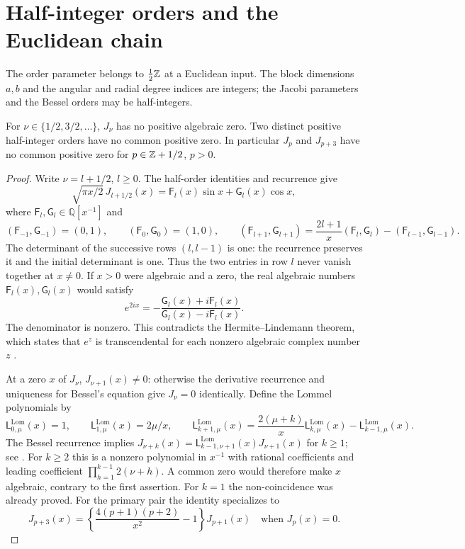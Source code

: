 \section{Half-integer orders and the Euclidean chain}\label{inf:sec-parity}

The order parameter belongs to $\tfrac12\mathbb{Z}$ at a Euclidean input.
The block dimensions $a,b$ and the angular and radial degree indices
are integers; the Jacobi parameters and the Bessel orders may be
half-integers.

\begin{lemma}\label{inf:half-integer-noncoincidence}
For $\nu\in\{1/2,3/2,\ldots\}$, $J_\nu$ has no positive algebraic
zero. Two distinct positive half-integer orders have no common positive
zero. In particular $J_p$ and $J_{p+3}$ have no common positive zero
for $p\in\mathbb{Z}+1/2$, $p>0$.
\end{lemma}
\begin{proof}
Write $\nu=l+1/2$, $l\ge0$. The half-order identities and recurrence
\cite[\S\S10.6, 10.16]{inf:dlmf} give
\[
 \sqrt{\pi x/2}\,J_{l+1/2}(x)
 =\mathsf F_l(x)\sin x+\mathsf G_l(x)\cos x,
\]
where $\mathsf F_l,\mathsf G_l\in\mathbb Q[x^{-1}]$ and
\[
 (\mathsf F_{-1},\mathsf G_{-1})=(0,1),\qquad
 (\mathsf F_0,\mathsf G_0)=(1,0),\qquad
 (\mathsf F_{l+1},\mathsf G_{l+1})
 =\frac{2l+1}{x}(\mathsf F_l,\mathsf G_l)
       -(\mathsf F_{l-1},\mathsf G_{l-1}).
\]
The determinant of the successive rows $(l,l-1)$ is one: the
recurrence preserves it and the initial determinant is one.
Thus the two entries in row $l$ never vanish together at $x\ne0$.
If $x>0$ were algebraic and a zero, the real algebraic numbers
$\mathsf F_l(x),\mathsf G_l(x)$ would satisfy
\[
 e^{2ix}=-\frac{\mathsf G_l(x)+i\mathsf F_l(x)}
                  {\mathsf G_l(x)-i\mathsf F_l(x)}.
\]
The denominator is nonzero. This contradicts the Hermite--Lindemann
theorem, which states that $e^z$ is transcendental for each nonzero
algebraic complex number $z$ \cite[\S1.2]{inf:BakerWustholz}.

At a zero $x$ of $J_\nu$, $J_{\nu+1}(x)\ne0$: otherwise the derivative
recurrence and uniqueness for Bessel's equation give $J_\nu=0$
identically. Define the Lommel polynomials by
\[
 \mathsf L^{\mathrm{Lom}}_{0,\mu}(x)=1,\qquad
 \mathsf L^{\mathrm{Lom}}_{1,\mu}(x)=2\mu/x,\qquad
 \mathsf L^{\mathrm{Lom}}_{k+1,\mu}(x)
 =\frac{2(\mu+k)}x\mathsf L^{\mathrm{Lom}}_{k,\mu}(x)
     -\mathsf L^{\mathrm{Lom}}_{k-1,\mu}(x).
\]
The Bessel recurrence implies
$J_{\nu+k}(x)=\mathsf L^{\mathrm{Lom}}_{k-1,\nu+1}(x)J_{\nu+1}(x)$
for $k\ge1$; see \cite{inf:watson}.
For $k\ge2$ this is a nonzero polynomial in $x^{-1}$ with rational
coefficients and leading coefficient $\prod_{h=1}^{k-1}2(\nu+h)$.
A common zero would therefore make $x$ algebraic, contrary to the
first assertion. For $k=1$ the non-coincidence was already proved.
For the primary pair the identity specializes to
\[
 J_{p+3}(x)=\left\{\frac{4(p+1)(p+2)}{x^2}-1\right\}J_{p+1}(x)
 \quad\text{when }J_p(x)=0.
\]
\end{proof}

